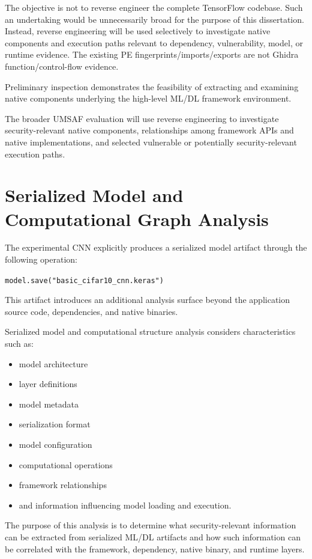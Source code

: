 \documentclass[
  12pt,
  letterpaper,
  oneside]{report}
\providecommand{\tightlist}{%
  \setlength{\itemsep}{0pt}\setlength{\parskip}{0pt}}
\begin{document}
The objective is not to reverse engineer the complete TensorFlow
codebase. Such an undertaking would be unnecessarily broad for the
purpose of this dissertation. Instead, reverse engineering will be used
selectively to investigate native components and execution paths
relevant to dependency, vulnerability, model, or runtime evidence. The
existing PE fingerprints/imports/exports are not Ghidra
function/control-flow evidence.

Preliminary inspection demonstrates the feasibility of extracting and
examining native components underlying the high-level ML/DL framework
environment.

The broader UMSAF evaluation will use reverse engineering to investigate
security-relevant native components, relationships among framework APIs
and native implementations, and selected vulnerable or potentially
security-relevant execution paths.

\section{Serialized Model and Computational Graph Analysis}\label{97-serialized-model-and-computational-graph-analysis}

The experimental CNN explicitly produces a serialized model artifact
through the following operation:

\texttt{model.save("basic\_cifar10\_cnn.keras")}

This artifact introduces an additional analysis surface beyond the
application source code, dependencies, and native binaries.

Serialized model and computational structure analysis considers
characteristics such as:

\begin{itemize}
\tightlist
\item
  model architecture
\item
  layer definitions
\item
  model metadata
\item
  serialization format
\item
  model configuration
\item
  computational operations
\item
  framework relationships
\item
  and information influencing model loading and execution.
\end{itemize}

The purpose of this analysis is to determine what security-relevant
information can be extracted from serialized ML/DL artifacts and how
such information can be correlated with the framework, dependency,
native binary, and runtime layers.
\end{document}
